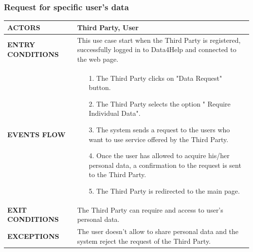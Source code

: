 \documentclass[a4paper]{article}
\begin{document}
\vspace{1cm}

\subsubsection{Request for specific user's data}
\begin{center}
    \begin{tabular}{l || p{8cm} ||}
        \bf{ACTORS} & Third Party, User \\ \hline
        \bf{ENTRY CONDITIONS} & This use case start when the Third Party is registered, successfully logged in to Data4Help and connected to the web page.   \\ \hline
        \bf{EVENTS FLOW} & \begin{itemize}[noitemsep, topsep=0cm, leftmargin=*] \vspace{-0.2cm}
            \item[1.] The Third Party clicks on "Data Request" button.
            \item[2.] The Third Party selects the option " Require Individual Data".
            \item[3.] The system sends a request to the users who want to use service offered by the Third Party.
            \item[4.] Once the user has allowed to acquire his/her personal data, a confirmation to the request is sent to the Third Party.
            \item[5.] The Third Party is redirected to the main page.
        \end{itemize}
        \\ \hline
        \bf{EXIT CONDITIONS} & The Third Party can require and access to user's personal data. \\ \hline
        \bf{EXCEPTIONS} & The user doesn't allow to share personal data and the system reject the request of the Third Party.
        \\ \hline \hline
    \end{tabular}
\end{center}

\vspace{1cm}

\end{document}
